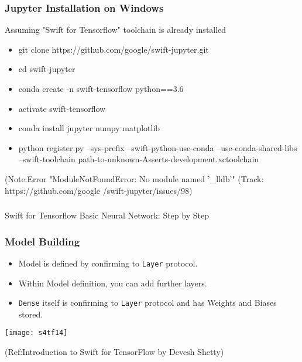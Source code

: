 \begin{frame} \frametitle{Jupyter Installation on Windows}

Assuming "Swift for Tensorflow" toolchain is already installed

\begin{itemize}
\item git clone https://github.com/google/swift-jupyter.git
\item cd swift-jupyter
\item conda create -n swift-tensorflow python==3.6
\item activate swift-tensorflow
\item conda install jupyter numpy matplotlib
\item python register.py --sys-prefix --swift-python-use-conda --use-conda-shared-libs --swift-toolchain path-to-unknown-Asserts-development.xctoolchain
\end{itemize}

{\tiny (Note:Error "ModuleNotFoundError: No module named '\_lldb'" (Track: https://github.com/google /swift-jupyter/issues/98)}
 
\end{frame}


\begin{frame}[fragile]\frametitle{}
\begin{center}
{\Large Swift for Tensorflow Basic Neural Network: Step by Step}
\end{center}
\end{frame}

\begin{frame}[fragile] \frametitle{Model Building}

\begin{itemize}
\item Model is defined by confirming to \lstinline|Layer| protocol.
\item Within Model definition, you can add further layers.
\item \lstinline|Dense| itself is confirming to \lstinline|Layer| protocol and has Weights and Biases stored.
\end{itemize}

\begin{center}
\texttt{[image: s4tf14]}
\end{center}


{\tiny (Ref:Introduction to Swift for TensorFlow by Devesh Shetty)}

\end{frame}

